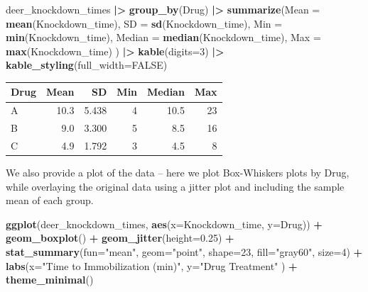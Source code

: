 \documentclass[
]{book}
\newenvironment{Shaded}{\begin{snugshade}}{\end{snugshade}}
\newcommand{\AttributeTok}[1]{\textcolor[rgb]{0.13,0.29,0.53}{#1}}
\newcommand{\ConstantTok}[1]{\textcolor[rgb]{0.56,0.35,0.01}{#1}}
\newcommand{\DecValTok}[1]{\textcolor[rgb]{0.00,0.00,0.81}{#1}}
\newcommand{\FloatTok}[1]{\textcolor[rgb]{0.00,0.00,0.81}{#1}}
\newcommand{\FunctionTok}[1]{\textcolor[rgb]{0.13,0.29,0.53}{\textbf{#1}}}
\newcommand{\NormalTok}[1]{#1}
\newcommand{\SpecialCharTok}[1]{\textcolor[rgb]{0.81,0.36,0.00}{\textbf{#1}}}
\newcommand{\StringTok}[1]{\textcolor[rgb]{0.31,0.60,0.02}{#1}}
\begin{document}
\begin{Shaded}
\begin{Highlighting}[]
\NormalTok{deer\_knockdown\_times }\SpecialCharTok{|\textgreater{}}
  \FunctionTok{group\_by}\NormalTok{(Drug) }\SpecialCharTok{|\textgreater{}}
  \FunctionTok{summarize}\NormalTok{(}\AttributeTok{Mean =} \FunctionTok{mean}\NormalTok{(Knockdown\_time),}
            \AttributeTok{SD =} \FunctionTok{sd}\NormalTok{(Knockdown\_time),}
            \AttributeTok{Min =} \FunctionTok{min}\NormalTok{(Knockdown\_time),}
            \AttributeTok{Median =} \FunctionTok{median}\NormalTok{(Knockdown\_time),}
            \AttributeTok{Max =} \FunctionTok{max}\NormalTok{(Knockdown\_time) ) }\SpecialCharTok{|\textgreater{}}
  \FunctionTok{kable}\NormalTok{(}\AttributeTok{digits=}\DecValTok{3}\NormalTok{) }\SpecialCharTok{|\textgreater{}}
  \FunctionTok{kable\_styling}\NormalTok{(}\AttributeTok{full\_width=}\ConstantTok{FALSE}\NormalTok{)}
\end{Highlighting}
\end{Shaded}

\begin{table}
\centering
\begin{tabular}{l|r|r|r|r|r}
\hline
Drug & Mean & SD & Min & Median & Max\\
\hline
A & 10.3 & 5.438 & 4 & 10.5 & 23\\
\hline
B & 9.0 & 3.300 & 5 & 8.5 & 16\\
\hline
C & 4.9 & 1.792 & 3 & 4.5 & 8\\
\hline
\end{tabular}
\end{table}

We also provide a plot of the data -- here we plot Box-Whiskers plots by Drug, while overlaying the original data using a jitter plot and including the sample mean of each group.

\begin{Shaded}
\begin{Highlighting}[]
\FunctionTok{ggplot}\NormalTok{(deer\_knockdown\_times, }\FunctionTok{aes}\NormalTok{(}\AttributeTok{x=}\NormalTok{Knockdown\_time, }\AttributeTok{y=}\NormalTok{Drug)) }\SpecialCharTok{+} 
  \FunctionTok{geom\_boxplot}\NormalTok{() }\SpecialCharTok{+} 
  \FunctionTok{geom\_jitter}\NormalTok{(}\AttributeTok{height=}\FloatTok{0.25}\NormalTok{) }\SpecialCharTok{+}
  \FunctionTok{stat\_summary}\NormalTok{(}\AttributeTok{fun=}\StringTok{"mean"}\NormalTok{, }\AttributeTok{geom=}\StringTok{"point"}\NormalTok{, }\AttributeTok{shape=}\DecValTok{23}\NormalTok{, }\AttributeTok{fill=}\StringTok{"gray60"}\NormalTok{, }\AttributeTok{size=}\DecValTok{4}\NormalTok{) }\SpecialCharTok{+} 
  \FunctionTok{labs}\NormalTok{(}\AttributeTok{x=}\StringTok{"Time to Immobilization (min)"}\NormalTok{, }\AttributeTok{y=}\StringTok{"Drug Treatment"}\NormalTok{ ) }\SpecialCharTok{+} 
  \FunctionTok{theme\_minimal}\NormalTok{()}
\end{Highlighting}
\end{Shaded}
\end{document}
